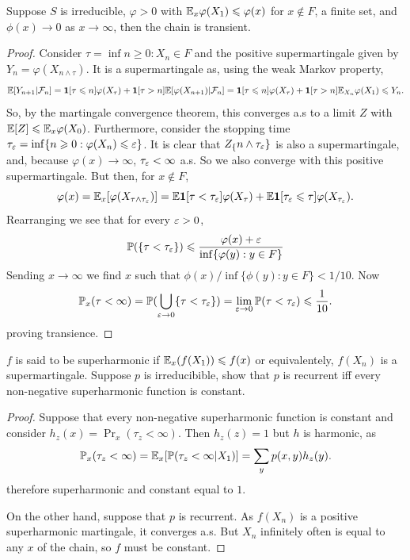 \begin{exercise}[5.3.5]
    Suppose $S$ is irreducible, $\varphi > 0$ with $\mathbb{E}_x \varphi(X_1) \leqslant \varphi(x)$ for $x \not \in F$, 
    a finite set, and $\phi(x) \to 0$ as $x \to \infty$, then the chain is transient.
\end{exercise}
\begin{proof}
    Consider $\tau = \inf{n \geq 0 : X_n \in F}$ and the 
    positive supermartingale given by $Y_n = \varphi(X_{n \land \tau})$. 
    It is a supermartingale as, using the weak Markov property,  
    \[
        \mathbb{E}[Y_{n+1}| \mathcal{F}_n] = \bm{1}[\tau \leqslant n]\varphi(X_\tau) + \bm{1}[\tau > n]\mathbb{E}[\varphi(X_{n+1})|\mathcal{F}_n]
        = \bm{1}[\tau \leqslant n]\varphi(X_\tau) + \bm{1}[\tau > n]\mathbb{E}_{X_{n}} \varphi(X_1) \leqslant Y_n.
    \]
    So, by the martingale convergence theorem, this converges a.s to a limit $Z$
    with $\mathbb{E}[Z] \leqslant \mathbb{E}_x\varphi(X_0)$. Furthermore, consider the stopping time 
    $\tau_\varepsilon = \inf\{n \geqslant 0: \varphi(X_n) \leqslant \varepsilon\}$. It is clear that
    $Z_\{n \land \tau_\varepsilon\}$ is also a supermartingale, and, because $\varphi(x) \to \infty$,
    $\tau_\varepsilon < \infty$ a.s. So we also converge with this positive supermartingale.
    But then, for $x \not \in F$,
    \[
        \varphi(x) = \mathbb{E}_x[\varphi(X_{\tau \land \tau_\varepsilon})] = 
        \mathbb{E} \bm{1}[\tau < \tau_{\varepsilon}]\varphi(X_\tau) + 
        \mathbb{E} \bm{1}[\tau_{\varepsilon} \leqslant \tau] \varphi(X_{\tau_\varepsilon}).
    \]
    Rearranging we see that for every $\varepsilon > 0$, 
    \[
    \mathbb{P}(\{\tau < \tau_\varepsilon\}) \leqslant \frac{\varphi(x) + \varepsilon}{\inf\{\varphi(y): y \in F\}}
    \]
    Sending $x \to \infty$ we find $x$ such that $\phi(x)/\inf\{\phi(y) : y \in F\} < 1/10$.
    Now
    \[
    \mathbb{P}_x(\tau < \infty) = \mathbb{P}(\bigcup_{\varepsilon \rightarrow 0} \{\tau < \tau_\varepsilon\}) = 
    \lim_{\varepsilon \rightarrow 0} \mathbb{P}(\tau < \tau_\varepsilon) \leqslant \frac{1}{10}.
    \]
    proving transience.
\end{proof}

\begin{exercise}[5.3.7]
    $f$ is said to be superharmonic if $\mathbb{E}_x(f(X_1)) \leqslant f(x)$ or 
    equivalentely, $f(X_n)$ is a supermartingale. Suppose $p$ is irreducibible,
    show that $p$ is recurrent iff every non-negative superharmonic function is constant.
\end{exercise}
\begin{proof}
    Suppose that every non-negative superharmonic function is constant and 
    consider $h_z(x) = \Pr_x(\tau_z < \infty)$. Then $h_z(z) = 1$ but $h$ is harmonic, 
    as
    \[
    \mathbb{P}_x(\tau_z < \infty) = \mathbb{E}_x[\mathbb{P}(\tau_z < \infty | X_1)] = \sum_{y} p(x,y)h_z(y).
    \]
    therefore superharmonic and constant equal to $1$.

    On the other hand, suppose that $p$ is recurrent. As $f(X_n)$ is a positive 
    superharmonic martingale, it converges a.s. But $X_n$ infinitely often is equal to any $x$
    of the chain, so $f$ must be constant.
\end{proof}


